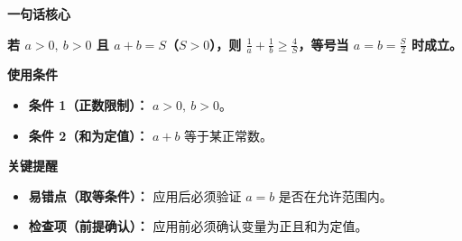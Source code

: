 \begin{summarybox}
	\textbf{\textcolor{CSummary}{一句话核心}}

	\textbf{若 $a>0,\ b>0$ 且 $a+b=S$（$S>0$），则 $\frac1a+\frac1b\ge\frac{4}{S}$，等号当 $a=b=\frac{S}{2}$ 时成立。}

	\medskip
	\textbf{\textcolor{CSummary}{使用条件}}
	\begin{itemize}[leftmargin=*, itemsep=0.5em, topsep=0.4em]
		\item \textbf{条件 1（正数限制）：} $a>0,\ b>0$。
		\item \textbf{条件 2（和为定值）：} $a+b$ 等于某正常数。
	\end{itemize}

	\medskip
	\textbf{\textcolor{CSummary}{关键提醒}}
	\begin{itemize}[leftmargin=*, itemsep=0.5em, topsep=0.4em]
		\item \textbf{易错点（取等条件）：} 应用后必须验证 $a=b$ 是否在允许范围内。
		\item \textbf{检查项（前提确认）：} 应用前必须确认变量为正且和为定值。
	\end{itemize}
\end{summarybox}
